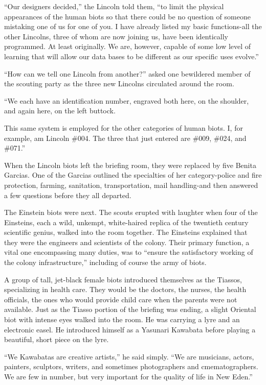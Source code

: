 \documentclass[]{article}
\begin{document}
{“Our designers decided,” the Lincoln told them, “to limit the physical appearances of the human biots so that there could be no question of someone mistaking one of us for one of you.  I have already listed my basic functions-all the other Lincolns, three of whom are now joining us, have been identically programmed.  At least originally.  We are, however, capable of some low level of learning that will allow our data bases to be different as our specific uses evolve.”

“How can we tell one Lincoln from another?” asked one bewildered member of the scouting party as the three new Lincolns circulated around the room.

“We each have an identification number, engraved both here, on the shoulder, and again here, on the left buttock.

This same system is employed for the other categories of human biots.  I, for example, am Lincoln \#004.  The three that just entered are \#009, \#024, and \#071.”

When the Lincoln biots left the briefing room, they were replaced by five Benita Garcias.  One of the Garcias outlined the specialties of her category-police and fire protection, farming, sanitation, transportation, mail handling-and then answered a few questions before they all departed.

The Einstein biots were next.  The scouts erupted with laughter when four of the Einsteins, each a wild, unkempt, white-haired replica of the twentieth century scientific genius, walked into the room together.  The Einsteins explained that they were the engineers and scientists of the colony.  Their primary function, a vital one encompassing many duties, was to “ensure the satisfactory working of the colony infrastructure,” including of course the army of biots.

A group of tall, jet-black female biots introduced themselves as the Tiassos, specializing in health care.  They would be the doctors, the nurses, the health officials, the ones who would provide child care when the parents were not available.  Just as the Tiasso portion of the briefing was ending, a slight Oriental biot with intense eyes walked into the room.  He was carrying a lyre and an electronic easel.  He introduced himself as a Yasunari Kawabata before playing a beautiful, short piece on the lyre.

“We Kawabatas are creative artists,” he said simply.  “We are musicians, actors, painters, sculptors, writers, and sometimes photographers and cmematographers.  We are few in number, but very important for the quality of life in New Eden.”

}
\end{document}
